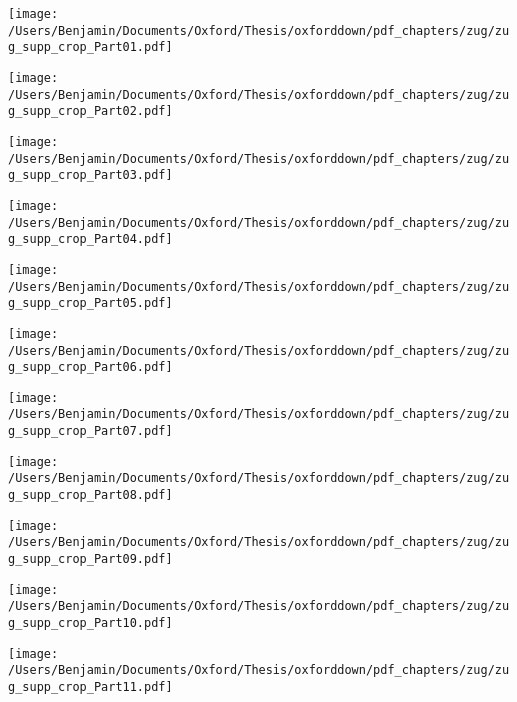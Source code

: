 \documentclass[a4paper, nobind]{templates/ociamthesis}
\begin{document}
\begin{center} \texttt{[image: /Users/Benjamin/Documents/Oxford/Thesis/oxforddown/pdf\_chapters/zug/zug\_supp\_crop\_Part01.pdf]} \end{center} \newpage 
 \begin{center} \texttt{[image: /Users/Benjamin/Documents/Oxford/Thesis/oxforddown/pdf\_chapters/zug/zug\_supp\_crop\_Part02.pdf]} \end{center} \newpage 
 \begin{center} \texttt{[image: /Users/Benjamin/Documents/Oxford/Thesis/oxforddown/pdf\_chapters/zug/zug\_supp\_crop\_Part03.pdf]} \end{center} \newpage 
 \begin{center} \texttt{[image: /Users/Benjamin/Documents/Oxford/Thesis/oxforddown/pdf\_chapters/zug/zug\_supp\_crop\_Part04.pdf]} \end{center} \newpage 
 \begin{center} \texttt{[image: /Users/Benjamin/Documents/Oxford/Thesis/oxforddown/pdf\_chapters/zug/zug\_supp\_crop\_Part05.pdf]} \end{center} \newpage 
 \begin{center} \texttt{[image: /Users/Benjamin/Documents/Oxford/Thesis/oxforddown/pdf\_chapters/zug/zug\_supp\_crop\_Part06.pdf]} \end{center} \newpage 
 \begin{center} \texttt{[image: /Users/Benjamin/Documents/Oxford/Thesis/oxforddown/pdf\_chapters/zug/zug\_supp\_crop\_Part07.pdf]} \end{center} \newpage 
 \begin{center} \texttt{[image: /Users/Benjamin/Documents/Oxford/Thesis/oxforddown/pdf\_chapters/zug/zug\_supp\_crop\_Part08.pdf]} \end{center} \newpage 
 \begin{center} \texttt{[image: /Users/Benjamin/Documents/Oxford/Thesis/oxforddown/pdf\_chapters/zug/zug\_supp\_crop\_Part09.pdf]} \end{center} \newpage 
 \begin{center} \texttt{[image: /Users/Benjamin/Documents/Oxford/Thesis/oxforddown/pdf\_chapters/zug/zug\_supp\_crop\_Part10.pdf]} \end{center} \newpage 
 \begin{center} \texttt{[image: /Users/Benjamin/Documents/Oxford/Thesis/oxforddown/pdf\_chapters/zug/zug\_supp\_crop\_Part11.pdf]} \end{center} \newpage 
\end{document}
